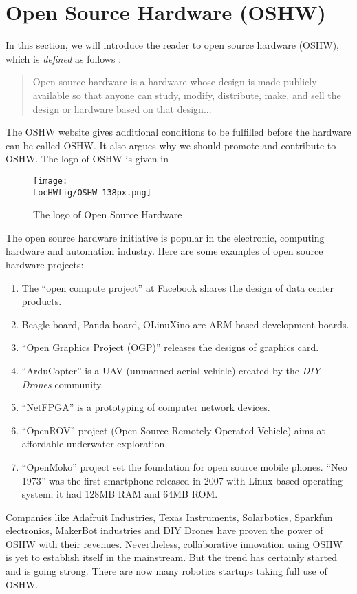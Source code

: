 \section{Open Source Hardware (OSHW)}
\label{sec:oshw}
In this section, we will introduce the reader to open source hardware
(OSHW), which is
\emph{defined} as follows \cite{oshw-ref}:
\begin{quote}
  Open source hardware is a hardware whose design is made publicly
  available so that anyone can study, modify, distribute, make, and sell
  the design or hardware based on that design...
\end{quote}
The OSHW website \cite{oshw-ref} gives additional conditions to be
fulfilled before the hardware can be called OSHW.  It also argues why
we should promote and contribute to OSHW.  The logo of OSHW is given
in  \cite{OSHW-logo-ref}.
\begin{figure}
  \centering
  \texttt{[image: \\LocHWfig/OSHW-138px.png]}
  \caption{The logo of Open Source Hardware}
  \label{fig:OSHW-logo}
\end{figure}
The open source hardware initiative is popular in the electronic,
computing hardware and automation industry.  Here are some examples of
open source hardware projects:
\begin{enumerate}
  \item The ``open compute project'' at Facebook shares the design of
        data center products.
  \item Beagle board, Panda board, OLinuXino are ARM based development
        boards.
  \item ``Open Graphics Project (OGP)'' releases the designs of
        graphics card.
  \item ``ArduCopter'' is a UAV (unmanned aerial vehicle) created by
        the \emph{DIY Drones} community.
  \item ``NetFPGA'' is a prototyping of computer network devices.
  \item ``OpenROV'' project (Open Source Remotely Operated Vehicle)
        aims at affordable underwater exploration.
  \item ``OpenMoko'' project set the foundation for open source mobile
        phones. ``Neo 1973'' was the first smartphone released in 2007
        with Linux based operating system, it had 128MB RAM and 64MB ROM.
\end{enumerate}

Companies like Adafruit Industries, Texas Instruments, Solarbotics,
Sparkfun electronics, MakerBot industries and DIY Drones have proven
the power of OSHW with their revenues.  Nevertheless, collaborative
innovation using OSHW is yet to establish itself in the mainstream.  But
the trend has certainly started and is going strong.  There are now
many robotics startups taking full use of OSHW.


